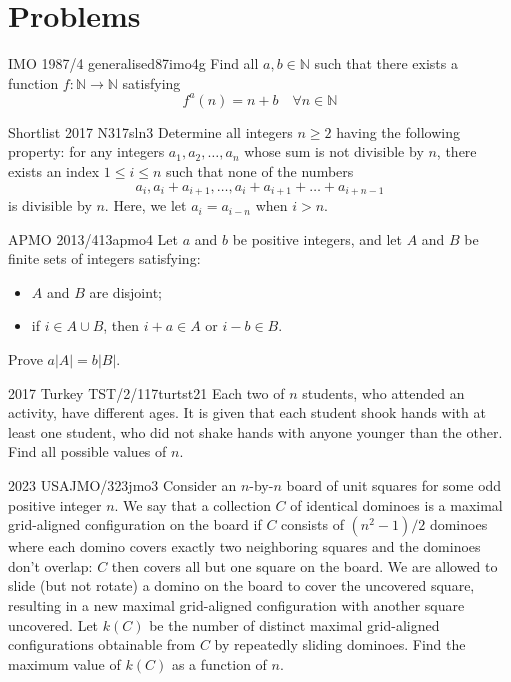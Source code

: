 \documentclass[11pt]{scrartcl}
\begin{document}
\section{Problems}

\begin{problem}{IMO 1987/4 generalised}{87imo4g}
  Find all \(a, b\in\mathbb N\) such that there exists a function 
  \(f:\mathbb N\rightarrow \mathbb N\) satisfying \[f^a(n)=n+b\quad\forall n\in\mathbb N\]
\end{problem}

\begin{problem}{Shortlist 2017 N3}{17sln3}
  Determine all integers $ n\geq 2$ having the following 
  property: for any integers $a_1,a_2,\ldots, a_n$ whose sum 
  is not divisible by $n$, there exists an index 
  $1 \leq i \leq n$ such that none of the numbers
  $$a_i,a_i+a_{i+1},\ldots,a_i+a_{i+1}+\ldots+a_{i+n-1}$$
  is divisible by $n$. Here, we let $a_i=a_{i-n}$ when $i >n$.
\end{problem}

\begin{problem}{APMO 2013/4}{13apmo4}
  Let $a$ and $b$ be positive integers, and let $A$ and $B$ be finite sets of integers satisfying:
\begin{itemize}
    \item $A$ and $B$ are disjoint;
    \item if $i \in A \cup B$, then $i + a \in A$ or $i - b \in B$.
\end{itemize}
Prove $a|A| = b|B|$.
\end{problem}


\begin{problem}{2017 Turkey TST/2/1}{17turtst21}
  Each two of $n$ students, who attended an activity, 
  have different ages. It is given that each student shook 
  hands with at least one student, who did not shake hands 
  with anyone younger than the other. Find all possible values 
  of $n$.
\end{problem}
\begin{problem}{2023 USAJMO/3}{23jmo3}
  Consider an $n$-by-$n$ board of unit squares for some odd 
  positive integer $n$. We say that a collection $C$ of 
  identical dominoes is a maximal grid-aligned configuration 
  on the board if $C$ consists of $(n^2-1)/2$ dominoes where 
  each domino covers exactly two neighboring squares and the 
  dominoes don't overlap: $C$ then covers all but one square 
  on the board. We are allowed to slide (but not rotate) a 
  domino on the board to cover the uncovered square, 
  resulting in a new maximal grid-aligned configuration 
  with another square uncovered. Let $k(C)$ be the number of 
  distinct maximal grid-aligned configurations obtainable 
  from $C$ by repeatedly sliding dominoes. Find the maximum 
  value of $k(C)$ as a function of $n$.
\end{problem}
\end{document}

